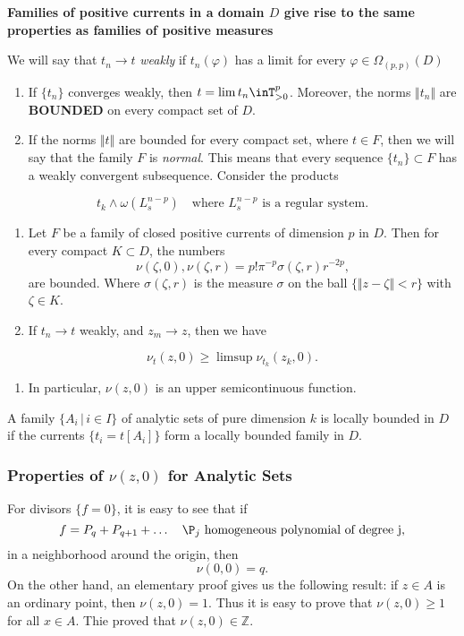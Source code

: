 \documentclass[12pt,twoside,a4paper]{report}
\begin{document}
\textbf{Families of positive currents in a domain $D$ give rise to the same properties as families of positive measures}

\begin{def}
We will say that $t_n\rightarrow t$ \emph{weakly} if $t_n(\varphi)$ has a limit for every $\varphi\in\Omega_{(p,p)}(D)$
\end{def}

\begin{enumerate}
\item If $\{t_n\}$ converges weakly, then $t=\lim t_n\inT^p_{>0}$. Moreover, the norms $\Vert t_n\Vert$ are \textbf{BOUNDED} on every compact set of $D$.
\item If the norms $\Vert t\Vert$ are bounded for every compact set, where $t\in F$, then we will say that the family $F$ is \emph{normal}. This means that every sequence $\{t_n\}\subset F$ has a weakly convergent subsequence.
\obs Consider the products
\end{enumerate}
\[
    t_k\wedge\omega(L^{n-p}_s)\quad\text{where }L^{n-p}_s\text{ is a regular system}.
\]
\begin{enumerate}
\item Let $F$ be a family of closed positive currents of dimension $p$ in $D$. Then for every compact $K\subset D$, the numbers
\[
        \nu(\zeta,0),\nu(\zeta,r)=p!\pi^{-p}\sigma(\zeta,r)r^{-2p},
   \]
\noindent are bounded. Where $\sigma(\zeta,r)$ is the measure $\sigma$ on the ball $\{\Vert z-\zeta\Vert<r\}$ with $\zeta\in K$.
\item If $t_n\rightarrow t$ weakly, and $z_m\rightarrow z$, then we have
\end{enumerate}
\begin{equation}
        \nu_t(z,0)\geq\limsup\nu_{t_k}(z_k,0).
\end{equation}
\begin{enumerate}
\item In particular, $\nu(z,0)$ is an upper semicontinuous function.
\end{enumerate}

\begin{def}
A family $\{A_i\,|\,i\in I\}$ of analytic sets of pure dimension $k$ is locally bounded in $D$ if the currents $\{t_i=t[A_i]\}$ form a locally bounded family in $D$.
\end{def}

\subsubsection{Properties of $\nu(z,0)$ for Analytic Sets}
\label{sec:org81bac70}
For divisors $\{f=0\}$, it is easy to see that if
\[
    f=P_q+P_{q+1}+\dots\quad\P_j\text{ homogeneous polynomial of degree j},
\]
\noindent in a neighborhood around the origin, then
\[
    \nu(0,0)=q.
\]
On the other hand, an elementary proof gives us the following result: if $z\in A$ is an ordinary point, then $\nu(z,0)=1$. Thus it is easy to prove that $\nu(z,0)\geq1$ for all $x\in A$. Thie proved that $\nu(z,0)\in\mathbb{Z}$.
\end{document}
